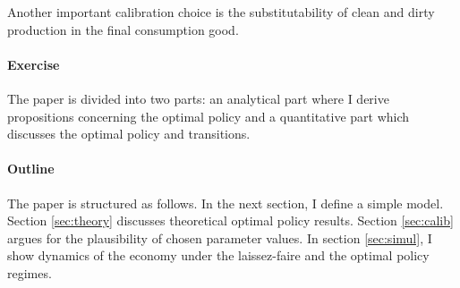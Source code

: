 Another important calibration choice is the substitutability of clean and dirty production in the final consumption good.

\paragraph{Exercise}
The paper is divided into two parts: an analytical part where I derive propositions concerning the optimal policy and a quantitative part which discusses the optimal policy and transitions. 



\paragraph{Outline}
The paper is structured as follows. In the next section, I define a simple model. %
Section \ref{sec:theory} discusses theoretical optimal policy results. Section \ref{sec:calib} argues for the plausibility of chosen parameter values. In section \ref{sec:simul}, I show dynamics of the economy under the laissez-faire and the optimal policy regimes. 

